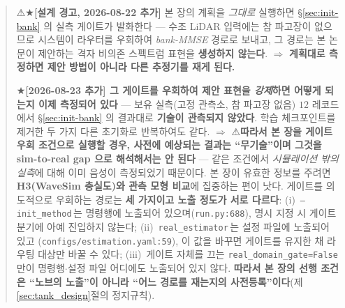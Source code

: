 \documentclass[11pt]{report}
\numberwithin{equation}{chapter}
\numberwithin{figure}{chapter}
\numberwithin{table}{chapter}
\begin{document}
\begin{quote}
⚠★\textbf{[설계 경고, 2026-08-22 추가]} 본 장의 계획을 \emph{그대로} 실행하면
\S\ref{sec:init-bank} 의 실측 게이트가 발화한다 --- 수조 LiDAR 입력에는 참 파고장이
없으므로 시스템이 라우터를 우회하여 \emph{bank-MMSE} 경로로 보내고, 그 경로는 본 논문이
제안하는 격자 비의존 스펙트럼 표현을 \textbf{생성하지 않는다}.
$\Rightarrow$ \textbf{계획대로 측정하면 제안 방법이 아니라 다른 추정기를 재게 된다.}

★\textbf{[2026-08-23 추가] 그 게이트를 우회하여 제안 표현을 \emph{강제}하면 어떻게 되는지
이제 측정되어 있다} --- 보유 실측(고정 관측소, 참 파고장 없음) $12$ 레코드에서
\S\ref{sec:init-bank} 의 결과대로 \textbf{기술이 관측되지 않았다}. 학습 체크포인트를
제거한 두 가지 다른 초기화로 반복하여도 같다.
$\Rightarrow$ ⚠\textbf{따라서 본 장을 게이트 우회 조건으로 실행할 경우, 사전에 예상되는
결과는 ``무기술''이며 그것을 sim-to-real gap 으로 해석해서는 안 된다} --- 같은 조건에서
\emph{시뮬레이션 밖의 실측}에 대해 이미 음성이 측정되었기 때문이다. 본 장이 유효한 정보를
주려면 \textbf{H3(WaveSim 충실도)와 관측 모형 비교}에 집중하는 편이 낫다.
게이트를 의도적으로 우회하는 경로는 \textbf{세 가지이고 노출 정도가 서로 다르다}:
(i)~\texttt{--init\_method}\,는 명령행에 노출되어 있으며(\texttt{run.py:688}),
명시 지정 시 게이트 분기에 아예 진입하지 않는다;
(ii)~\texttt{real\_estimator}\,는 설정 파일에 노출되어 있고
(\texttt{configs/estimation.yaml:59}), 이 값을 바꾸면 게이트를 유지한 채
라우팅 대상만 바꿀 수 있다;
(iii)~게이트 자체를 끄는 \texttt{real\_domain\_gate=False}\,만이
명령행$\cdot$설정 파일 어디에도 노출되어 있지 않다.
\textbf{따라서 본 장의 선행 조건은 ``노브의 노출''이 아니라 ``어느 경로를 재는지의
사전등록''이다}(제\ref{sec:tank_design}절의 정지규칙).
\end{quote}

\label{chap:tank}
\end{document}
